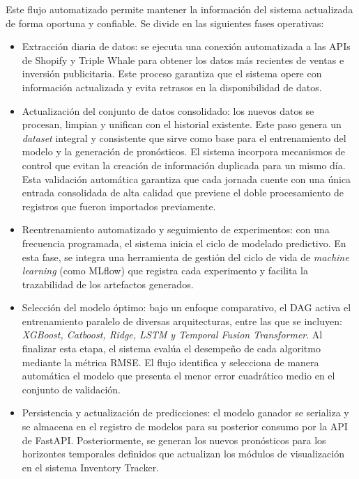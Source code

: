 Este flujo automatizado permite mantener la información del sistema actualizada de forma oportuna y confiable. Se divide en las siguientes fases operativas:

\begin{itemize}
    \item Extracción diaria de datos: se ejecuta una conexión automatizada a las APIs de Shopify y Triple Whale para obtener los datos más recientes de ventas e inversión publicitaria. Este proceso garantiza que el sistema opere con información actualizada y evita retrasos en la disponibilidad de datos.
    
    \item Actualización del conjunto de datos consolidado: los nuevos datos se procesan, limpian y unifican con el historial existente. Este paso genera un \textit{dataset} integral y consistente que sirve como base para el entrenamiento del modelo y la generación de pronósticos. El sistema incorpora mecanismos de control que evitan la creación de información duplicada para un mismo día. Esta validación automática garantiza que cada jornada cuente con una única entrada consolidada de alta calidad que previene el doble procesamiento de registros que fueron importados previamente.
    
	\item Reentrenamiento automatizado y seguimiento de experimentos: con una frecuencia programada, el sistema inicia el ciclo de modelado predictivo. En esta fase, se integra una herramienta de gestión del ciclo de vida de \textit{machine learning} (como MLflow) que registra cada experimento y facilita la trazabilidad de los artefactos generados.

	\item Selección del modelo óptimo: bajo un enfoque comparativo, el DAG activa el entrenamiento paralelo de diversas arquitecturas, entre las que se incluyen: \textit{XGBoost, Catboost, Ridge, LSTM y Temporal Fusion Transformer}. Al finalizar esta etapa, el sistema evalúa el desempeño de cada algoritmo mediante la métrica RMSE. El flujo identifica y selecciona de manera automática el modelo que presenta el menor error cuadrático medio en el conjunto de validación.
	
	\item Persistencia y actualización de predicciones: el modelo ganador se serializa y se almacena en el registro de modelos para su posterior consumo por la API de FastAPI. Posteriormente, se generan los nuevos pronósticos para los horizontes temporales definidos que actualizan los módulos de visualización en el sistema Inventory Tracker.   
\end{itemize}


